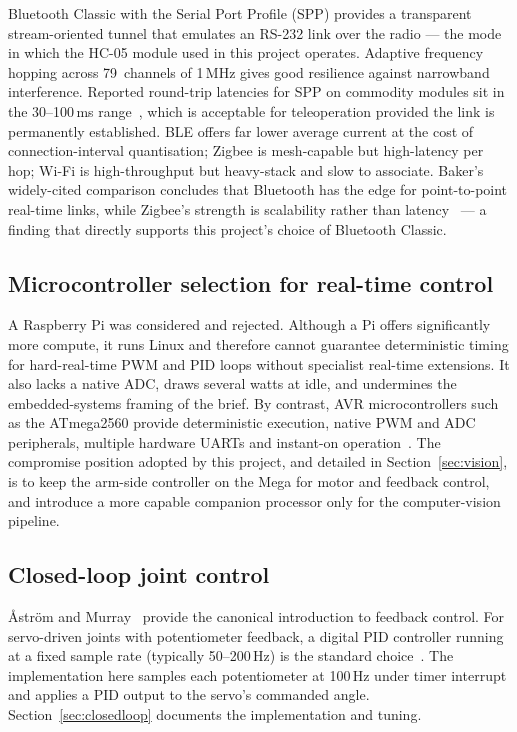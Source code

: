 Bluetooth Classic with the Serial Port Profile (SPP) provides a
transparent stream-oriented tunnel that emulates an RS-232 link over
the radio --- the mode in which the HC-05 module used in this project
operates. Adaptive frequency hopping across 79~channels of 1\,MHz
gives good resilience against narrowband interference. Reported
round-trip latencies for SPP on commodity modules sit in the
30--100\,ms range~\cite{gomez2012}, which is acceptable for
teleoperation provided the link is permanently established. BLE
offers far lower average current at the cost of connection-interval
quantisation; Zigbee is mesh-capable but high-latency per hop;
Wi-Fi is high-throughput but heavy-stack and slow to associate.
Baker's widely-cited comparison concludes that Bluetooth has the edge
for point-to-point real-time links, while Zigbee's strength is
scalability rather than latency~\cite{baker2005} --- a finding that
directly supports this project's choice of Bluetooth Classic.

\subsection{Microcontroller selection for real-time control}
A Raspberry Pi was considered and rejected. Although a Pi offers
significantly more compute, it runs Linux and therefore cannot
guarantee deterministic timing for hard-real-time PWM and PID loops
without specialist real-time extensions. It also lacks a native ADC,
draws several watts at idle, and undermines the embedded-systems
framing of the brief. By contrast, AVR microcontrollers such as the
ATmega2560 provide deterministic execution, native PWM and ADC
peripherals, multiple hardware UARTs and instant-on
operation~\cite{atmega2560}. The compromise position adopted by this
project, and detailed in Section~\ref{sec:vision}, is to keep the
arm-side controller on the Mega for motor and feedback control, and
introduce a more capable companion processor only for the
computer-vision pipeline.

\subsection{Closed-loop joint control}
\AA str\"om and Murray~\cite{astrom2008} provide the canonical
introduction to feedback control. For servo-driven joints with
potentiometer feedback, a digital PID controller running at a fixed
sample rate (typically 50--200\,Hz) is the standard
choice~\cite{spong2020}. The implementation here samples each
potentiometer at 100\,Hz under timer interrupt and applies a PID
output to the servo's commanded angle. Section~\ref{sec:closedloop}
documents the implementation and tuning.
